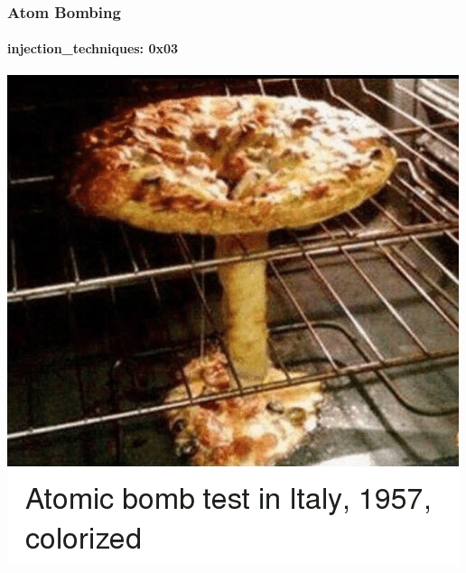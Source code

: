 \documentclass[aspectratio=169]{beamer}
\begin{document}
\begin{frame}
  \frametitle{Atom Bombing}
  \framesubtitle{injection\_techniques: 0x03}
  \begin{center}
    \includegraphics[scale=0.36]{atom-bomb-meme}
  \end{center}
\end{frame}
\end{document}
